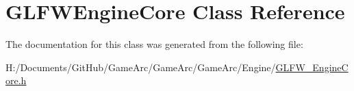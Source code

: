 \hypertarget{class_g_l_f_w_engine_core}{\section{G\+L\+F\+W\+Engine\+Core Class Reference}
\label{class_g_l_f_w_engine_core}
}


The documentation for this class was generated from the following file\+:\begin{DoxyCompactItemize}
\item 
H\+:/\+Documents/\+Git\+Hub/\+Game\+Arc/\+Game\+Arc/\+Game\+Arc/\+Engine/\hyperlink{_g_l_f_w___engine_core_8h}{G\+L\+F\+W\+\_\+\+Engine\+Core.\+h}\end{DoxyCompactItemize}
